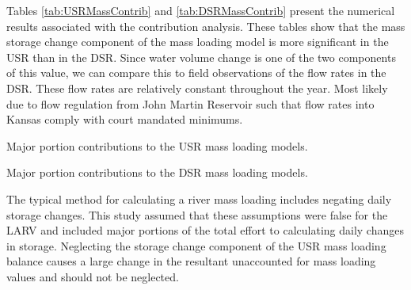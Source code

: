 \begin{linenumbers}
Tables \ref{tab:USRMassContrib} and \ref{tab:DSRMassContrib} present the numerical results associated with the contribution analysis.  These tables show that the mass storage change component of the mass loading model is more significant in the USR than in the DSR.  Since water volume change is one of the two components of this value, we can compare this to field observations of the flow rates in the DSR.  These flow rates are relatively constant throughout the year.  Most likely due to flow regulation from John Martin Reservoir such that flow rates into Kansas comply with court mandated minimums.

\begin{table}[htbp]
	\centering
	\caption[Major portion contributions to the USR mass loading models.]{Major portion contributions to the USR mass loading models.}
	\label{tab:USRMassContrib}
	
\end{table}
\tablevspace
\begin{table}[htbp]
	\centering
	\caption[Major portion contributions to the DSR mass loading models.]{Major portion contributions to the DSR mass loading models.}
	\label{tab:DSRMassContrib}
	
\end{table}

The typical method for calculating a river mass loading includes negating daily storage changes.  This study assumed that these assumptions were false for the LARV and included major portions of the total effort to calculating daily changes in storage.  Neglecting the storage change component of the USR mass loading balance causes a large change in the resultant unaccounted for mass loading values and should not be neglected.

\clearpage{}
\end{linenumbers}